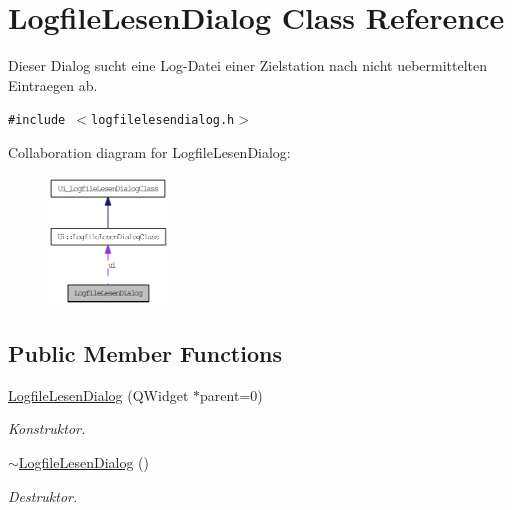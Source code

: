 \hypertarget{class_logfile_lesen_dialog}{
\section{LogfileLesenDialog Class Reference}
\label{class_logfile_lesen_dialog}
}
Dieser Dialog sucht eine Log-Datei einer Zielstation nach nicht uebermittelten Eintraegen ab.  


{\tt \#include $<$logfilelesendialog.h$>$}

Collaboration diagram for LogfileLesenDialog:\nopagebreak
\begin{figure}[H]
\begin{center}
\leavevmode
\includegraphics[width=90pt]{class_logfile_lesen_dialog__coll__graph}
\end{center}
\end{figure}
\subsection*{Public Member Functions}
\begin{CompactItemize}
\item 
\hyperlink{class_logfile_lesen_dialog_dcec514ae2ecb97a1a753a0e12335229}{LogfileLesenDialog} (QWidget $\ast$parent=0)
\begin{CompactList}\small\item\em Konstruktor. \item\end{CompactList}\item 
\hyperlink{class_logfile_lesen_dialog_6688d3b86807c1f62ae679ae1870a6b2}{$\sim$LogfileLesenDialog} ()
\begin{CompactList}\small\item\em Destruktor. \item\end{CompactList}\end{CompactItemize}
